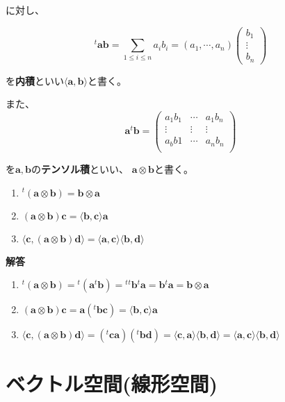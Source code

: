 \documentclass[dvipdfmx,autodetect-engine]{jsarticle}
\theoremstyle{definition}
\newcommand{\innerProduct}[2]{\langle \bm{#1}, \bm{#2} \rangle}
\newcommand{\tensorProduct}[2]{\bm{#1} \otimes \bm{#2}}
\begin{document}
に対し、


$$
{}^t\!\bm{a}\bm{b} = \sum_{1 \leq i \leq n} a_ib_i = (a_1, \cdots, a_n)\begin{pmatrix}
b_1 \\
\vdots \\
b_n
\end{pmatrix}
$$

を{\bf 内積}といい$\langle \bm{a}, \bm{b} \rangle$と書く。

また、
$$
\bm{a}{}^t\!\bm{b} = \begin{pmatrix}
a_1b_1 & \cdots & a_1b_n \\
\vdots & \vdots & \vdots \\
a_bb1 & \cdots & a_nb_n \\
\end{pmatrix}
$$

を$\bm{a}, \bm{b}$の{\bf テンソル積}といい、 $\bm{a} \otimes \bm{b}$と書く。


\begin{enumerate}
\renewcommand{\labelenumi}{(\arabic{enumi})}
\item ${}^t(\tensorProduct{a}{b}) = \tensorProduct{b}{a}$
\item $(\tensorProduct{a}{b})\bm{c} = \innerProduct{b}{c}\bm{a}$
\item $\innerProduct{c}{(\tensorProduct{a}{b})\bm{d}} = \innerProduct{a}{c}\innerProduct{b}{d}$
\end{enumerate}

{\bf 解答}

\begin{enumerate}
\renewcommand{\labelenumi}{(\arabic{enumi})}
\item ${}^t(\tensorProduct{a}{b}) = {}^t(\bm{a}{}^t\bm{b}) = {}^t{}^t\bm{b}{}^t\bm{a} = \bm{b}{}^t\bm{a} = \tensorProduct{b}{a}$
\item $(\tensorProduct{a}{b})\bm{c} = \bm{a}({}^t\bm{b}\bm{c}) = \innerProduct{b}{c}\bm{a}$
\item $\innerProduct{c}{(\tensorProduct{a}{b})\bm{d}} = ({}^t\bm{c}\bm{a})({}^t\bm{b}\bm{d}) = \langle \bm{c}, \bm{a} \rangle \langle \bm{b}, \bm{d} \rangle = \langle \bm{a}, \bm{c} \rangle \langle \bm{b}, \bm{d} \rangle$
\end{enumerate}


\section{ベクトル空間(線形空間)}
\end{document}
